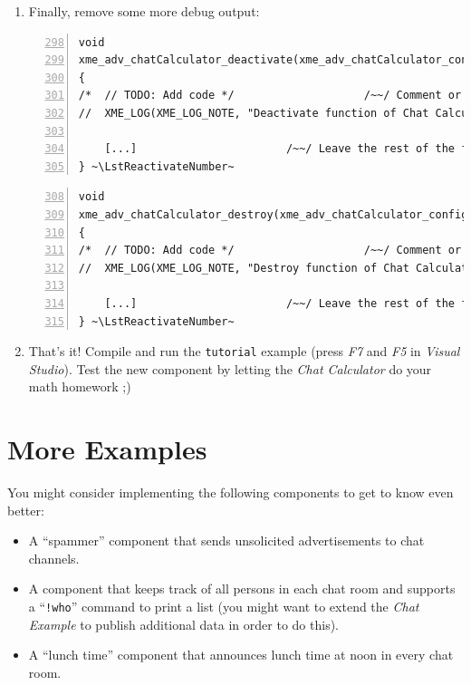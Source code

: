 \begin{enumerate}
	\item Finally, remove some more debug output:

\begin{lstlisting}[numbers=left,firstnumber=298]
void
xme_adv_chatCalculator_deactivate(xme_adv_chatCalculator_configStruct_t* config)
{
/*	// TODO: Add code */                    /~~/ Comment or remove this block
//	XME_LOG(XME_LOG_NOTE, "Deactivate function of Chat Calculator called!\n"); ~\LstSuppressNumber~

	[...]                       /~~/ Leave the rest of the function as-is
} ~\LstReactivateNumber~
\end{lstlisting}

\begin{lstlisting}[numbers=left,firstnumber=308]
void
xme_adv_chatCalculator_destroy(xme_adv_chatCalculator_configStruct_t* config)
{
/*	// TODO: Add code */                    /~~/ Comment or remove this block
//	XME_LOG(XME_LOG_NOTE, "Destroy function of Chat Calculator called!\n"); ~\LstSuppressNumber~

	[...]                       /~~/ Leave the rest of the function as-is
} ~\LstReactivateNumber~
\end{lstlisting}

	\item That's it! Compile and run the \verb|tutorial| example (press \emph{F7} and \emph{F5} in \emph{Visual Studio}).
		Test the new component by letting the \emph{Chat Calculator} do your math homework ;)
\end{enumerate}

\section{More Examples}

You might consider implementing the following components to get to know \xme even better:
\begin{itemize}
	\item A ``spammer'' component that sends unsolicited advertisements to chat channels.
	\item A component that keeps track of all persons in each chat room and supports a ``\verb|!who|'' command to print a list
		(you might want to extend the \emph{Chat Example} to publish additional data in order to do this).
	\item A ``lunch time'' component that announces lunch time at noon in every chat room.
\end{itemize}